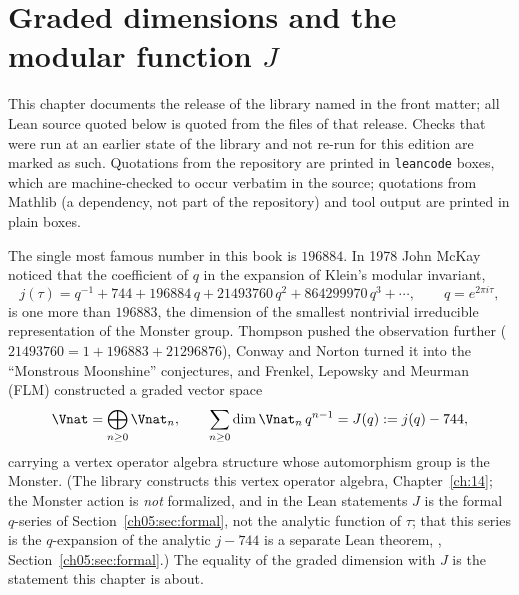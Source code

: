 \chapter{Graded dimensions and the modular function \texorpdfstring{$J$}{J}}\label{ch:05}

\providecommand{\chfiveH}{\mathfrak{H}}
\providecommand{\chfiveSL}{\mathrm{SL}_2(\Z)}

This chapter documents the release of the library named in the front matter; all Lean source quoted below is quoted from the files of that release. 
Checks that were run at an earlier state of the library and not re-run for this edition are marked as such. Quotations from the
repository are printed in \texttt{leancode} boxes, which are machine-checked to occur verbatim in
the source; quotations from Mathlib (a dependency, not part of the repository) and tool output are
printed in plain boxes.

The single most famous number in this book is $196884$. In 1978 John McKay noticed that the
coefficient of $q$ in the expansion of Klein's modular invariant,
\begin{equation*}
  j(\tau) = q^{-1} + 744 + 196884\,q + 21493760\,q^2 + 864299970\,q^3 + \cdots,
  \qquad q = e^{2\pi i \tau},
\end{equation*}
is one more than $196883$, the dimension of the smallest nontrivial irreducible representation
of the Monster group. Thompson pushed the observation further ($21493760 = 1 + 196883 +
21296876$), Conway and Norton turned it into the ``Monstrous Moonshine'' conjectures, and
Frenkel, Lepowsky and Meurman (FLM) constructed a graded vector space
\begin{equation*}
  \Vnat = \bigoplus_{n\ge 0} \Vnat_n,\qquad \sum_{n\ge 0}\dim \Vnat_n \, q^{n-1} = J(q) := j(q) - 744,
\end{equation*}
carrying a vertex operator algebra structure whose automorphism group is the Monster. (The
library constructs this vertex operator algebra, Chapter~\ref{ch:14}; the Monster action is
\emph{not} formalized, and in the Lean statements $J$ is the formal $q$-series of
Section~\ref{ch05:sec:formal}, not the analytic function of $\tau$; that this series is the $q$-expansion of the
analytic $j-744$ is a separate Lean theorem, , Section~\ref{ch05:sec:formal}.) The
equality of the graded dimension with $J$ is the statement this chapter is about.

